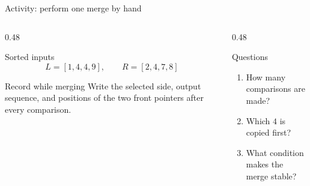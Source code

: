 \documentclass[aspectratio=169]{beamer}
\begin{document}
\begin{frame}{Activity: perform one merge by hand}
  \begin{columns}[T]
    \begin{column}{0.48\textwidth}
      \begin{block}{Sorted inputs}
        \[
          L=[1,4,4,9],\qquad R=[2,4,7,8]
        \]
      \end{block}
      \begin{exampleblock}{Record while merging}
        Write the selected side, output sequence, and positions of the two
        front pointers after every comparison.
      \end{exampleblock}
    \end{column}
    \begin{column}{0.48\textwidth}
      \begin{alertblock}{Questions}
        \begin{enumerate}
          \item How many comparisons are made?
          \item Which $4$ is copied first?
          \item What condition makes the merge stable?
        \end{enumerate}
      \end{alertblock}
    \end{column}
  \end{columns}
\end{frame}
\end{document}
